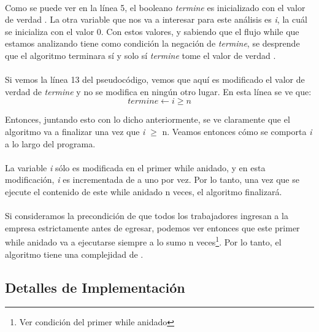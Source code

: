\paragraph{}
Como se puede ver en la línea 5, el booleano \textit{termine} es inicializado con el valor de verdad \false. La otra variable que nos va a interesar para este análisis es \textit{i}, la cuál se inicializa con el valor 0. Con estos valores, y sabiendo que el flujo while que estamos analizando tiene como condición la negación de \textit{termine}, se desprende que el algoritmo terminara sí y solo sí \textit{termine} tome el valor de verdad \true .

\paragraph{}
Si vemos la línea 13 del pseudocódigo, vemos que aquí es modificado el valor de verdad de \textit{termine} y no se modifica en ningún otro lugar. En esta línea se ve que:
\begin{equation}
termine \leftarrow i \geq n
\end{equation}

Entonces, juntando esto con lo dicho anteriormente, se ve claramente que el algoritmo va a finalizar una vez que \textit{i} \ensuremath{\geq} n. Veamos entonces cómo se comporta \textit{i} a lo largo del programa.

\paragraph{}
La variable \textit{i} sólo es modificada en el primer while anidado, y en esta modificación, \textit{i} es incrementada de a uno por vez. Por lo tanto, una vez que se ejecute el contenido de este while anidado n veces, el algoritmo finalizará.

\paragraph{}
Si consideramos la precondición de que todos los trabajadores ingresan a la empresa estrictamente antes de egresar, podemos ver entonces que este primer while anidado va a ejecutarse siempre a lo sumo n veces\footnote{Ver condición del primer while anidado}. Por lo tanto, el algoritmo tiene una complejidad de .



\subsection{Detalles de Implementación}

